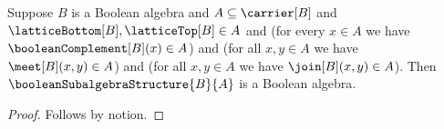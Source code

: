 

\begin{proposition}\label{notion_prefix_predicate_unfolded}
    Suppose $B$ is a Boolean algebra and
        $A\subseteq\carrier[B]$ and
        $\latticeBottom[B],\latticeTop[B]\in A$ and
        (for every $x\in A$ we have
            $\booleanComplement[B](x)\in A$) and
        (for all $x,y\in A$ we have $\meet[B](x,y)\in A$) and
        (for all $x,y\in A$ we have $\join[B](x,y)\in A$).
    Then $\booleanSubalgebraStructure{B}{A}$ is a Boolean algebra.
\end{proposition}
\begin{proof}
    Follows by notion.
\end{proof}

